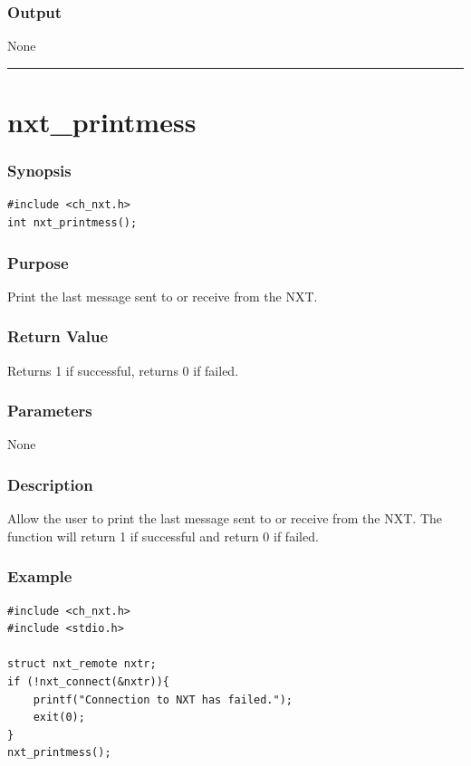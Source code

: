 \documentclass[12pt]{article}
\begin{document}
\subsubsection*{Output}
None 
\\

\hrule
\newpage
\section*{nxt\_printmess}

\subsubsection*{Synopsis}
\begin{verbatim}
#include <ch_nxt.h>
int nxt_printmess();
\end{verbatim}

\subsubsection*{Purpose}
Print the last message sent to or receive from the NXT.

\subsubsection*{Return Value}
Returns 1 if successful, returns 0 if failed.

\subsubsection*{Parameters}
None

\subsubsection*{Description}
Allow the user to print the last message sent to or receive from the NXT.
The function will return 1 if successful and return 0 if failed.

\subsubsection*{Example}
\begin{verbatim}
#include <ch_nxt.h> 
#include <stdio.h>

struct nxt_remote nxtr;
if (!nxt_connect(&nxtr)){
    printf("Connection to NXT has failed.");
    exit(0);
}
nxt_printmess();    
\end{verbatim}
\end{document}
